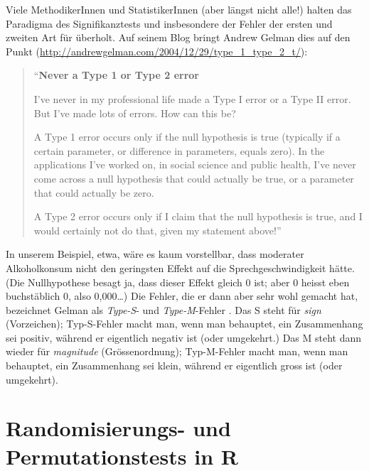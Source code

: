 \documentclass[oneside, 10pt]{book}\usepackage[]{graphicx}\usepackage[]{xcolor}
\begin{document}
Viele MethodikerInnen und StatistikerInnen
(aber längst nicht alle!) halten das Paradigma des
Signifikanztests und insbesondere der Fehler der
ersten und zweiten Art für überholt. Auf seinem
Blog bringt Andrew Gelman dies auf den Punkt
(\url{http://andrewgelman.com/2004/12/29/type_1_type_2_t/}):

\begin{quotation}
``\textbf{Never a Type 1 or Type 2 error}

I've never in my professional life made a Type I error or a Type II error. But I've made lots of errors. How can this be?

A Type 1 error occurs only if the null hypothesis is true (typically if a certain parameter, or difference in parameters, equals zero). In the applications I've worked on, in social science and public health, I've never come across a null hypothesis that could actually be true, or a parameter that could actually be zero.

A Type 2 error occurs only if I claim that the null hypothesis is true, and I would certainly not do that, given my statement above!''
\end{quotation}

In unserem Beispiel, etwa, wäre es kaum vorstellbar, dass moderater Alkoholkonsum
nicht den geringsten Effekt auf die Sprechgeschwindigkeit hätte. (Die Nullhypothese besagt ja, dass dieser Effekt gleich 0 ist; aber 0 heisst eben buchstäblich 0, also 0,000\dots)
Die Fehler, die er dann aber sehr wohl gemacht hat, bezeichnet Gelman
als \textit{Type-S}- und \textit{Type-M}-Fehler \citep{Gelman2014}.
Das S steht für \textit{sign} (Vorzeichen); Typ-S-Fehler macht man, wenn man behauptet, ein Zusammenhang sei positiv, während er eigentlich negativ ist (oder umgekehrt.) Das M steht dann wieder für \textit{magnitude} (Grössenordnung);
Typ-M-Fehler macht man, wenn man behauptet, ein Zusammenhang sei klein, während er eigentlich gross ist (oder umgekehrt).


\section{Randomisierungs- und Permutationstests in R}
\end{document}

